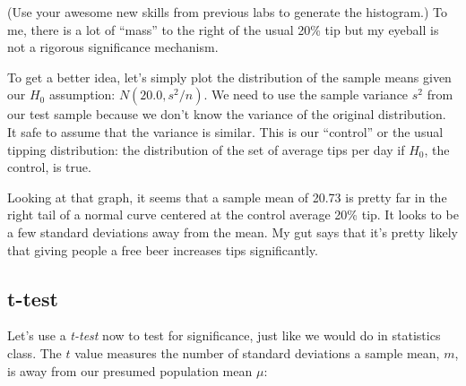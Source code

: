 \begin{fullwidth}
(Use your awesome new skills from previous labs to generate the histogram.) To me, there is a lot of ``mass'' to the right of the usual 20\% tip but my eyeball is not a rigorous significance mechanism. 

\step To get a better idea, let's simply plot the distribution of the sample means given our $H_0$ assumption: $N(20.0, s^2/n)$.  We need to use the sample variance $s^2$ from our test sample because we don't know the variance of the original distribution. It safe to assume that the variance is similar. This is our ``control'' or the usual tipping distribution: the distribution of the set of average tips per day if $H_0$, the control, is true.


Looking at that graph, it seems that a sample mean of 20.73 is pretty far in the right tail of a normal curve centered at the control average 20\% tip. It looks to be a few standard deviations away from the mean. My gut says that it's pretty likely that giving people a free beer increases tips significantly.

\subsection{t-test}

\setcounter{problem}{1}

\step Let's use a {\em t-test} now to test for significance, just like we would do in statistics class. The $t$ value measures the number of standard deviations a sample mean, $m$, is away from our presumed population mean $\mu$: \\


\end{fullwidth}
